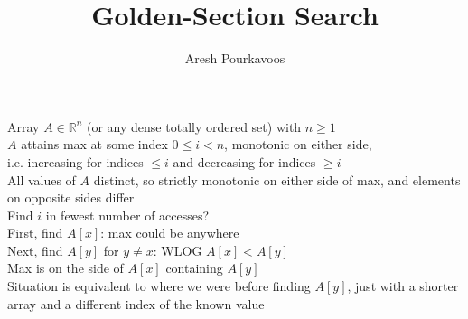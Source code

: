 \documentclass{article}
\begin{document}
\title{Golden-Section Search}
\author{Aresh Pourkavoos}
\maketitle

Array $A \in \mathbb{R}^n$
(or any dense totally ordered set) with $n \geq 1$ \\
$A$ attains max at some index $0 \leq i < n$, monotonic on either side, \\
i.e. increasing for indices $\leq i$ and decreasing for indices $\geq i$ \\
All values of $A$ distinct, so strictly monotonic on either side of max,
and elements on opposite sides differ \\
Find $i$ in fewest number of accesses? \\

First, find $A[x]$: max could be anywhere \\
Next, find $A[y]$ for $y \neq x$: WLOG $A[x] < A[y]$ \\
Max is on the side of $A[x]$ containing $A[y]$ \\
Situation is equivalent to where we were before finding $A[y]$,
just with a shorter array and a different index of the known value \\
\end{document}
